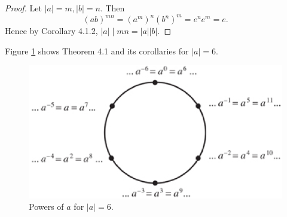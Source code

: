 \documentclass{article}
\newtheorem{theorem}{Theorem}[section]
\theoremstyle{definition}
\begin{document}
\begin{proof}
    Let $|a|=m,|b|=n$. Then
    \begin{equation*}
        (ab)^{mn} = (a^m)^n(b^n)^m = e^ne^m = e.
    \end{equation*}
    Hence by Corollary 4.1.2, $|a| \mid mn = |a||b|$.
\end{proof}

Figure \ref{thm4.1} shows Theorem 4.1 and its corollaries for $|a|=6$.

\begin{figure}[!htbp]
    \centering
    \includegraphics[width=0.6\linewidth]{figures/thm4.1.png}
    \caption{Powers of $a$ for $|a|=6$.}
    \label{thm4.1}
\end{figure}

\noindent{}
\end{document}
